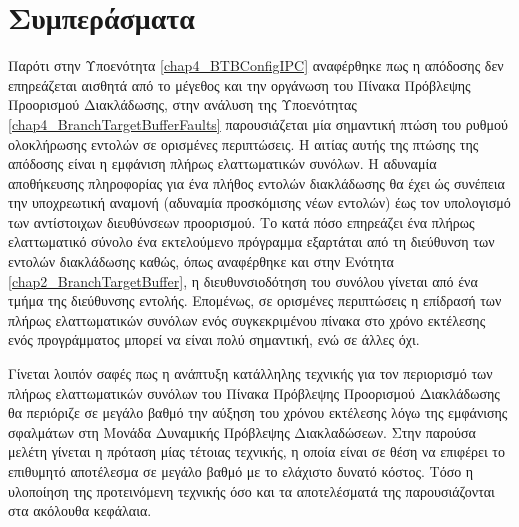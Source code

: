 
\section{Συμπεράσματα}
\label{chap4_FaultsAnalysisConclusions}

Παρότι στην Υποενότητα \ref{chap4_BTBConfigIPC} αναφέρθηκε πως η απόδοσης δεν επηρεάζεται αισθητά από το μέγεθος και την οργάνωση του Πίνακα Πρόβλεψης Προορισμού Διακλάδωσης, στην ανάλυση της Υποενότητας \ref{chap4_BranchTargetBufferFaults} παρουσιάζεται μία σημαντική πτώση του ρυθμού ολοκλήρωσης εντολών σε ορισμένες περιπτώσεις. Η αιτίας αυτής της πτώσης της απόδοσης είναι η εμφάνιση πλήρως ελαττωματικών συνόλων. Η αδυναμία αποθήκευσης πληροφορίας για ένα πλήθος εντολών διακλάδωσης θα έχει ώς συνέπεια την υποχρεωτική αναμονή (αδυναμία προσκόμισης νέων εντολών) έως τον υπολογισμό των αντίστοιχων διευθύνσεων προορισμού. Το κατά πόσο επηρεάζει ένα πλήρως ελαττωματικό σύνολο ένα εκτελούμενο πρόγραμμα εξαρτάται από τη διεύθυνση των εντολών διακλάδωσης καθώς, όπως αναφέρθηκε και στην Ενότητα \ref{chap2_BranchTargetBuffer}, η διευθυνσιοδότηση του συνόλου γίνεται από ένα τμήμα της διεύθυνσης εντολής. Επομένως, σε ορισμένες περιπτώσεις η επίδρασή των πλήρως ελαττωματικών συνόλων ενός συγκεκριμένου πίνακα στο χρόνο εκτέλεσης ενός προγράμματος μπορεί να είναι πολύ σημαντική, ενώ σε άλλες όχι.
\par
Γίνεται λοιπόν σαφές πως η ανάπτυξη κατάλληλης τεχνικής για τον περιορισμό των πλήρως ελαττωματικών συνόλων του Πίνακα Πρόβλεψης Προορισμού Διακλάδωσης θα περιόριζε σε μεγάλο βαθμό την αύξηση του χρόνου εκτέλεσης λόγω της εμφάνισης σφαλμάτων στη Μονάδα Δυναμικής Πρόβλεψης Διακλαδώσεων. Στην παρούσα μελέτη γίνεται η πρόταση μίας τέτοιας τεχνικής, η οποία είναι σε θέση να επιφέρει το επιθυμητό αποτέλεσμα σε μεγάλο βαθμό με το ελάχιστο δυνατό κόστος. Τόσο η υλοποίηση της προτεινόμενη τεχνικής όσο και τα αποτελέσματά της παρουσιάζονται στα ακόλουθα κεφάλαια.

